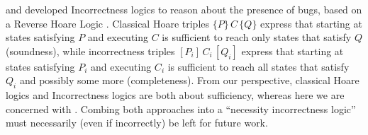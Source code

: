 






\citeauthor{IncorrectnessLogic} and \citeauthor{IncorrectSeparation}
developed Incorrectness logics to reason about the presence of bugs, 
based on a Reverse Hoare Logic \cite{reverseHoare}.
Classical Hoare triples $\{ P \}\, C\, \{ Q \}$ express  that starting 
at states satisfying $P$ and executing   $C$  is sufficient to reach only states
that satisfy $ Q $ (soundness), while
 incorrectness triples $[ P_i ]\, C_i\, [ Q _i ]$ express  that starting at  
 states satisfying $P_i$ and executing  $C_i$ is sufficient to reach 
 all states that satisfy $Q_i$ and possibly some more (completeness).
From our perspective, classical Hoare logics and Incorrectness logics
are both about sufficiency, whereas here we are concerned with \Nec.
Combing both approaches into a ``necessity incorrectness logic''
must necessarily (even if incorrectly) be left for future work.


